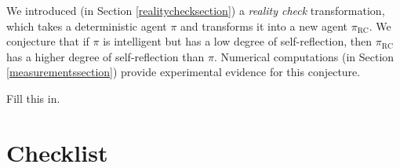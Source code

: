 \documentclass{article}
\def\RC{\textrm{RC}}
\begin{document}
We introduced (in Section \ref{realitychecksection}) a \emph{reality check}
transformation, which takes a deterministic agent $\pi$ and transforms it
into a new agent $\pi_{\RC}$. We conjecture that if $\pi$ is intelligent but has a low
degree of self-reflection, then $\pi_{\RC}$ has a higher degree of self-reflection
than $\pi$. Numerical computations (in Section \ref{measurementssection}) provide
experimental evidence for this conjecture.


\begin{ack}
Fill this in.
\end{ack}





\section*{Checklist}

\end{document}
